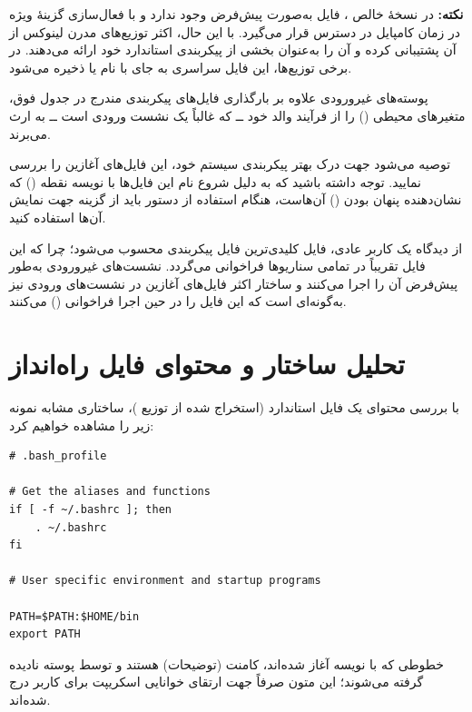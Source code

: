 \begin{note}
\textbf{نکته:} در نسخهٔ خالص ، فایل  به‌صورت پیش‌فرض وجود ندارد و با فعال‌سازی گزینهٔ ویژه در زمان کامپایل در دسترس قرار می‌گیرد. با این حال، اکثر توزیع‌های مدرن لینوکس از آن پشتیبانی کرده و آن را به‌عنوان بخشی از پیکربندی استاندارد خود ارائه می‌دهند. در برخی توزیع‌ها، این فایل سراسری به جای  با نام  یا  ذخیره می‌شود.
\end{note}

پوسته‌های غیرورودی علاوه بر بارگذاری فایل‌های پیکربندی مندرج در جدول فوق، متغیرهای محیطی () را از فرآیند والد خود ــ که غالباً یک نشست ورودی است ــ به ارث می‌برند.

توصیه می‌شود جهت درک بهتر پیکربندی سیستم خود، این فایل‌های آغازین را بررسی نمایید. توجه داشته باشید که به دلیل شروع نام این فایل‌ها با نویسه نقطه () که نشان‌دهنده پنهان بودن () آن‌هاست، هنگام استفاده از دستور  باید از گزینه  جهت نمایش آن‌ها استفاده کنید.

از دیدگاه یک کاربر عادی، فایل  کلیدی‌ترین فایل پیکربندی محسوب می‌شود؛ چرا که این فایل تقریباً در تمامی سناریوها فراخوانی می‌گردد. نشست‌های غیرورودی به‌طور پیش‌فرض آن را اجرا می‌کنند و ساختار اکثر فایل‌های آغازین در نشست‌های ورودی نیز به‌گونه‌ای است که این فایل را در حین اجرا فراخوانی () می‌کنند.

\section{تحلیل ساختار و محتوای فایل راه‌انداز}

با بررسی محتوای یک فایل  استاندارد (استخراج شده از توزیع )، ساختاری مشابه نمونه زیر را مشاهده خواهیم کرد:

\begin{latin}
\begin{lstlisting}
# .bash_profile

# Get the aliases and functions
if [ -f ~/.bashrc ]; then
    . ~/.bashrc
fi

# User specific environment and startup programs

PATH=$PATH:$HOME/bin
export PATH
\end{lstlisting}
\end{latin}

خطوطی که با نویسه \cmd{\#} آغاز شده‌اند، کامنت (توضیحات) هستند و توسط پوسته نادیده گرفته می‌شوند؛ این متون صرفاً جهت ارتقای خوانایی اسکریپت برای کاربر درج شده‌اند.

